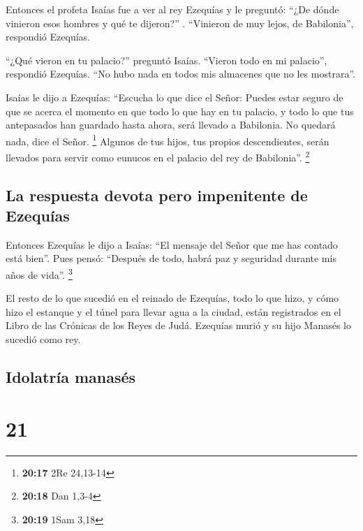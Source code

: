  Entonces el profeta Isaías fue a ver al rey Ezequías y
le preguntó: ``¿De dónde vinieron esos hombres y qué te dijeron?'' .
``Vinieron de muy lejos, de Babilonia'', respondió Ezequías.

 ``¿Qué vieron en tu palacio?'' preguntó Isaías. ``Vieron
todo en mi palacio'', respondió Ezequías. ``No hubo nada en todos mis
almacenes que no les mostrara''.

 Isaías le dijo a Ezequías: ``Escucha lo que dice el
Señor:  Puedes estar seguro de que se acerca el momento
en que todo lo que hay en tu palacio, y todo lo que tus antepasados han
guardado hasta ahora, será llevado a Babilonia. No quedará nada, dice el
Señor. \footnote{\textbf{20:17} 2Re 24,13-14}  Algunos de
tus hijos, tus propios descendientes, serán llevados para servir como
eunucos en el palacio del rey de Babilonia''. \footnote{\textbf{20:18}
  Dan 1,3-4}

\hypertarget{la-respuesta-devota-pero-impenitente-de-ezequuxedas}{%
\subsection{La respuesta devota pero impenitente de
Ezequías}\label{la-respuesta-devota-pero-impenitente-de-ezequuxedas}}

 Entonces Ezequías le dijo a Isaías: ``El mensaje del
Señor que me has contado está bien''. Pues pensó: ``Después de todo,
habrá paz y seguridad durante mis años de vida''. \footnote{\textbf{20:19}
  1Sam 3,18}

 El resto de lo que sucedió en el reinado de Ezequías,
todo lo que hizo, y cómo hizo el estanque y el túnel para llevar agua a
la ciudad, están registrados en el Libro de las Crónicas de los Reyes de
Judá.  Ezequías murió y su hijo Manasés lo sucedió como
rey.

\hypertarget{idolatruxeda-manasuxe9s}{%
\subsection{Idolatría manasés}\label{idolatruxeda-manasuxe9s}}

\hypertarget{section-20}{%
\section{21}\label{section-20}}


